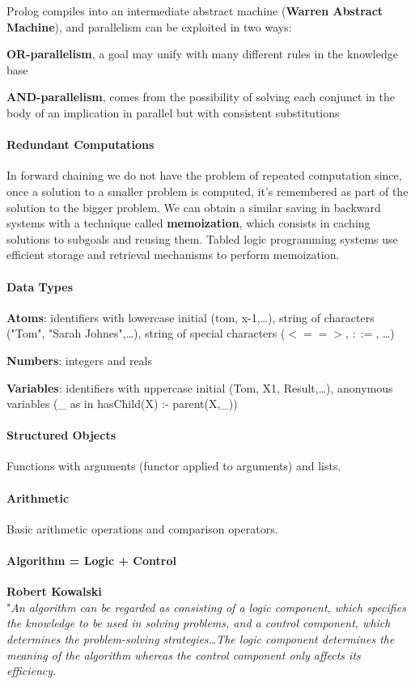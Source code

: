 \documentclass[10pt]{report}
\begin{document}
Prolog compiles into an intermediate abstract machine (\textbf{Warren Abstract Machine}), and parallelism can be exploited in two ways:
\begin{list}{}{}
	\item \textbf{OR-parallelism}, a goal may unify with many different rules in the knowledge base
	\item \textbf{AND-parallelism}, comes from the possibility of solving each conjunct in the body of an implication in parallel but with consistent substitutions
\end{list}
\paragraph{Redundant Computations} In forward chaining we do not have the problem of repeated computation since, once a solution to a smaller problem is computed, it's remembered as part of the solution to the bigger problem. We can obtain a similar saving in backward systems with a technique called \textbf{memoization}, which consists in caching solutions to subgoals and reusing them. Tabled logic programming systems use efficient storage and retrieval mechanisms to perform memoization.
\paragraph{Data Types}\begin{list}{}{}
	\item \textbf{Atoms}: identifiers with lowercase initial (tom, x-1,\ldots), string of characters ("Tom", "Sarah Johnes",\ldots), string of special characters ($<==>$, $::=$, \ldots)
	\item \textbf{Numbers}: integers and reals
	\item \textbf{Variables}: identifiers with uppercase initial (Tom, X1, Result,\ldots), anonymous variables (\_ as in hasChild(X) :- parent(X,\_))
\end{list}
\paragraph{Structured Objects} Functions with arguments (functor applied to arguments) and lists.
\paragraph{Arithmetic} Basic arithmetic operations and comparison operators.
\paragraph{Algorithm = Logic + Control} \textbf{Robert Kowalski}\\
"\textit{An algorithm can be regarded as consisting of a logic component, which specifies the knowledge to be used in solving problems, and a control component, which determines the problem-solving strategies\ldots The logic component determines the meaning of the algorithm whereas the control component only affects its efficiency.}
\end{document}
